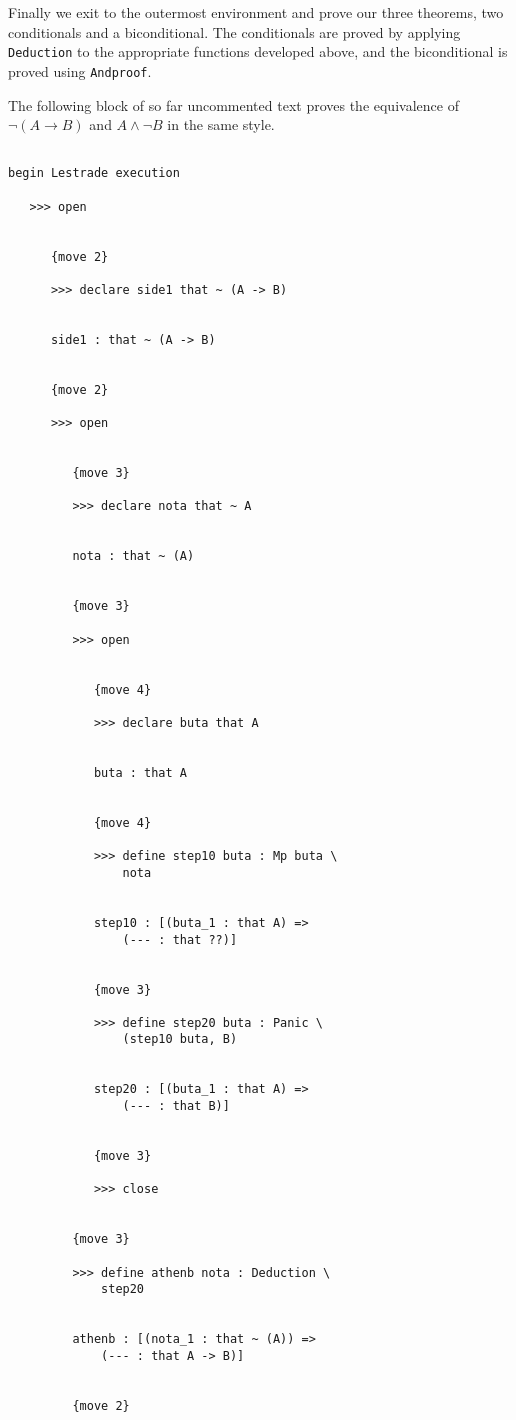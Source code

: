 \documentclass[12pt]{article}
\begin{document}
Finally we exit to the outermost environment and prove our three theorems, two conditionals and a biconditional.  The conditionals are proved by applying
{\tt Deduction} to the appropriate functions developed above, and the biconditional is proved using {\tt Andproof}.

The following block of so far uncommented text proves the equivalence of $\neg(A \rightarrow B)$ and $A \wedge \neg B$ in the same style.

\begin{verbatim}

begin Lestrade execution

   >>> open


      {move 2}

      >>> declare side1 that ~ (A -> B)


      side1 : that ~ (A -> B)


      {move 2}

      >>> open


         {move 3}

         >>> declare nota that ~ A


         nota : that ~ (A)


         {move 3}

         >>> open


            {move 4}

            >>> declare buta that A


            buta : that A


            {move 4}

            >>> define step10 buta : Mp buta \
                nota


            step10 : [(buta_1 : that A) => 
                (--- : that ??)]


            {move 3}

            >>> define step20 buta : Panic \
                (step10 buta, B)


            step20 : [(buta_1 : that A) => 
                (--- : that B)]


            {move 3}

            >>> close


         {move 3}

         >>> define athenb nota : Deduction \
             step20


         athenb : [(nota_1 : that ~ (A)) => 
             (--- : that A -> B)]


         {move 2}


\end{verbatim}
\end{document}
